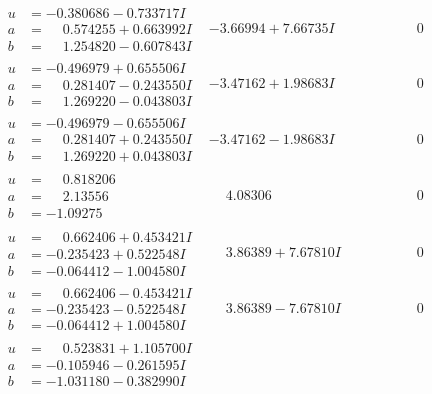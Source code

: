 \documentclass[1p]{elsarticle_modified}
\theoremstyle{definition}
\begin{document}
$$\begin{array}{c|c|c}
\begin{aligned}
u &= -0.380686 - 0.733717 I \\
a &= \phantom{-}0.574255 + 0.663992 I \\
b &= \phantom{-}1.254820 - 0.607843 I\end{aligned}
 & -3.66994 + 7.66735 I & \phantom{-0.000000 } 0 \\ \hline\begin{aligned}
u &= -0.496979 + 0.655506 I \\
a &= \phantom{-}0.281407 - 0.243550 I \\
b &= \phantom{-}1.269220 - 0.043803 I\end{aligned}
 & -3.47162 + 1.98683 I & \phantom{-0.000000 } 0 \\ \hline\begin{aligned}
u &= -0.496979 - 0.655506 I \\
a &= \phantom{-}0.281407 + 0.243550 I \\
b &= \phantom{-}1.269220 + 0.043803 I\end{aligned}
 & -3.47162 - 1.98683 I & \phantom{-0.000000 } 0 \\ \hline\begin{aligned}
u &= \phantom{-}0.818206\phantom{ +0.000000I} \\
a &= \phantom{-}2.13556\phantom{ +0.000000I} \\
b &= -1.09275\phantom{ +0.000000I}\end{aligned}
 & \phantom{-}4.08306\phantom{ +0.000000I} & \phantom{-0.000000 } 0 \\ \hline\begin{aligned}
u &= \phantom{-}0.662406 + 0.453421 I \\
a &= -0.235423 + 0.522548 I \\
b &= -0.064412 - 1.004580 I\end{aligned}
 & \phantom{-}3.86389 + 7.67810 I & \phantom{-0.000000 } 0 \\ \hline\begin{aligned}
u &= \phantom{-}0.662406 - 0.453421 I \\
a &= -0.235423 - 0.522548 I \\
b &= -0.064412 + 1.004580 I\end{aligned}
 & \phantom{-}3.86389 - 7.67810 I & \phantom{-0.000000 } 0 \\ \hline\begin{aligned}
u &= \phantom{-}0.523831 + 1.105700 I \\
a &= -0.105946 - 0.261595 I \\
b &= -1.031180 - 0.382990 I\end{aligned}

\end{array}$$
\end{document}
